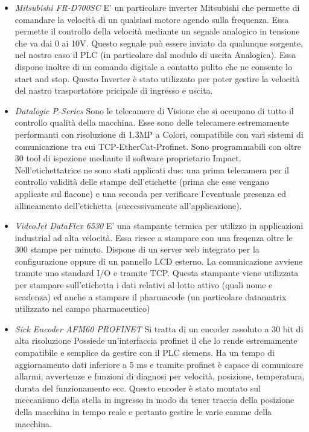 \documentclass[12pt, a4paper, oneside]{book}
\begin{document}
\begin{itemize}
	\item \textit{Mitsubishi FR-D700SC}
	E' un particolare inverter Mitsubishi che permette di comandare la velocità di un qualsiasi motore agendo sulla frequenza. Essa permette il controllo della velocità mediante un segnale analogico in tensione che va dai 0 ai 10V. Questo segnale può essere inviato da qualunque sorgente, nel nostro caso il PLC (in particolare dal modulo di uscita Analogica). Essa dispone inoltre di un comando digitale a contatto pulito che ne consente lo start and stop. Questo Inverter è stato utilizzato per poter gestire la velocità del nastro trasportatore pricipale di ingresso e uscita.
	
	\item \textit{Datalogic P-Series}
	Sono le telecamere di Visione che si occupano di tutto il controllo qualità della macchina. Esse sono delle telecamere estremamente performanti con risoluzione di 1.3MP a Colori, compatibile con vari sistemi di comunicazione tra cui TCP-EtherCat-Profinet. Sono programmabili con oltre 30 tool di ispezione mediante il software proprietario Impact. Nell'etichettatrice ne sono stati applicati due: una prima telecamera per il controllo validità delle stampe dell'etichette (prima che esse vengano applicate sul flacone) e una seconda per verificare l'eventuale presenza ed allineamento dell'etichetta (successivamente all'applicazione).
	
	\item \textit{VideoJet DataFlex 6530}
	E' una stampante termica per utilizzo in applicazioni industrial ad alta velocità. Essa riesce a stampare con una freqenza oltre le 300 stampe per minuto. Dispone di un server web integrato per la configurazione oppure di un pannello LCD esterno. La comunicazione avviene tramite uno standard I/O e tramite TCP. Questa stampante viene utilizzata per stampare sull'etichetta i dati relativi al lotto attivo (quali nome e scadenza) ed anche a stampare il pharmacode (un particolare datamatrix utilizzato nel campo pharmaceutico)
	
	\item \textit{Sick Encoder AFM60 PROFINET}
	Si tratta di un encoder assoluto a 30 bit di alta risoluzione 
	Possiede un'interfaccia profinet il che lo rende estremamente compatibile e semplice da gestire con il PLC siemens. Ha un tempo di aggiornamento dati inferiore a 5 ms e tramite profinet è capace di comunicare allarmi, avvertenze e funzioni di diagnosi per velocità, posizione, temperatura, durata del funzionamento ecc. Questo encoder è stato montato sul meccanismo della stella in ingresso in modo da tener traccia della posizione della macchina in tempo reale e pertanto gestire le varie camme della macchina.


\end{itemize}
\end{document}

